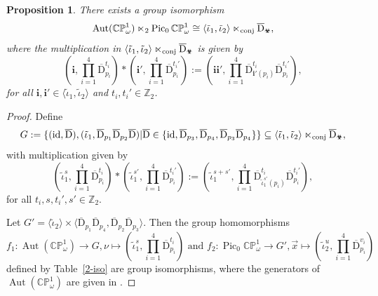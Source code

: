 \documentclass[11pt,a4paper,reqno]{amsart}%
\theoremstyle{plain}
\newtheorem{proposition}[proposition]{Proposition}
\theoremstyle{definition}
\numberwithin{equation}{section}
\numberwithin{equation}{section}
\def\<{\langle}
\def\>{\rangle}
\def\ZZ{\mathbb{Z}}
\newcommand{\vx}{\vec{x}}
\newcommand{\Pic}{\operatorname{Pic}\nolimits}
\def\wt{\omega}
\def\Aut{\operatorname{Aut}}
\def\CPone{\mathbb{CP}^1_{\wt}}
\def\vot{\text{\Biohazard}}
\begin{document}
  \begin{proposition}\label{keep slope}
There  exists a group isomorphism
    \[
\Aut(\CPone) \ltimes_2 \Pic_0\CPone \cong \langle\tilde\iota_1,\tilde\iota_2\rangle \ltimes_{\rm conj}\overline{\mathrm{D}}_{\vot},
\] where  the multiplication in $\langle\tilde\iota_1,\tilde\iota_2\rangle\ltimes_{\rm conj} \overline{\mathrm{D}}_{\vot}$ is given by  
 \[
(\mathbf{i}, \prod_{i=1}^4 \overline{\mathrm{D}}_{p_i}^{t_i}) * (\mathbf{i}',\prod_{i=1}^4\overline{\mathrm{D}}_{p_i}^{t_i'}) := ( \mathbf{i}\mathbf{i}'  ,\prod_{i=1}^4 \overline{\mathrm{D}}_{\mathbf{i}'(p_i)}^{t_i}\overline{\mathrm{D}}_{p_i}^{t_i' }),  
\]for all $\mathbf{i},\mathbf{i}'\in \langle\tilde\iota_1,\tilde\iota_2\rangle$ and  $t_i,  t_i' \in \ZZ_2$. 
\end{proposition}
\begin{proof}
  Define 
\[ G:=
\{ ( { \rm id}, \overline{\mathrm{D}} ), (\tilde\iota_1, 
\overline{\mathrm{D}}_{p_1}\overline{\mathrm{D}}_{p_2}\overline{\mathrm{D}})|\overline{\mathrm{D}}\in\{ { \rm id}, \overline{\mathrm{D}}_{p_3} ,\overline{\mathrm{D}}_{p_4},\overline{\mathrm{D}}_{p_3}\overline{\mathrm{D}}_{p_4} \}
\}\subseteq \langle\tilde\iota_1,\tilde\iota_2\rangle\ltimes_{\mathrm{conj}}\overline{\mathrm{D}}_{\vot},
\]
with multiplication given by
 \[
(\tilde\iota_1^s , \prod_{i=1}^4 \overline{\mathrm{D}}_{p_i}^{t_i}) * (\tilde\iota_1^{s'} ,\prod_{i=1}^4\overline{\mathrm{D}}_{p_i}^{t_i'}) := (  \tilde\iota_1^{s+s'} ,\prod_{i=1}^4 \overline{\mathrm{D}}_{\tilde\iota_1^{s'}(p_i)}^{t_i}\overline{\mathrm{D}}_{p_i}^{t_i'}),  
\]for all  $  t_i ,{s}, t_i', {s'} \in \ZZ_2$.

Let $G'=\<\tilde\iota_2\>\times \<\overline{\mathrm{D}}_{p_1}\overline{\mathrm{D}}_{p_4},\overline{\mathrm{D}}_{p_2}\overline{\mathrm{D}}_{p_3}\>$.
Then  the  group homomorphisms
\[
f_1:\Aut(\CPone)\to G,\nu  \mapsto(\tilde\iota_1^s,\prod_{i=1}^4 \overline{\mathrm{D}}_{p_i}^{t_i}) \text{ and }  f_2: \Pic_0\CPone\to G',\vx\mapsto(\tilde\iota_2^u,\prod_{i=1}^4 \overline{\mathrm{D}}_{p_i}^{v_i}  )
\] defined by Table~\ref{2-iso} are group isomorphisms, where the generators of $\Aut(\CPone)$ are given in .

\begin{table}[htbp]
\centering
\caption{Images of generators under $f_1$ and $f_2$}
\label{2-iso}
\renewcommand{\arraystretch}{1.3}
\setlength{\tabcolsep}{10pt}


\end{table}
\end{proof}
\end{document}
